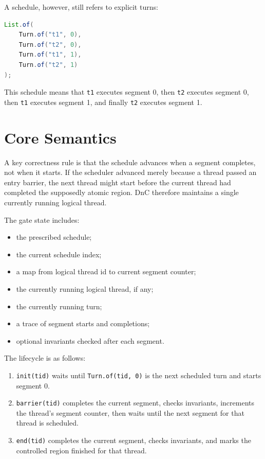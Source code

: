 \documentclass[11pt]{article}
\begin{document}
A schedule, however, still refers to explicit turns:

\begin{lstlisting}[language=Java,caption={A prescribed schedule}]
List.of(
    Turn.of("t1", 0),
    Turn.of("t2", 0),
    Turn.of("t1", 1),
    Turn.of("t2", 1)
);
\end{lstlisting}

This schedule means that \texttt{t1} executes segment 0, then \texttt{t2} executes segment 0, then \texttt{t1} executes segment 1, and finally \texttt{t2} executes segment 1.

\section{Core Semantics}

A key correctness rule is that the schedule advances when a segment completes, not when it starts. If the scheduler advanced merely because a thread passed an entry barrier, the next thread might start before the current thread had completed the supposedly atomic region. DnC therefore maintains a single currently running logical thread.

The gate state includes:

\begin{itemize}[nosep]
  \item the prescribed schedule;
  \item the current schedule index;
  \item a map from logical thread id to current segment counter;
  \item the currently running logical thread, if any;
  \item the currently running turn;
  \item a trace of segment starts and completions;
  \item optional invariants checked after each segment.
\end{itemize}

The lifecycle is as follows:

\begin{enumerate}[nosep]
  \item \texttt{init(tid)} waits until \texttt{Turn.of(tid, 0)} is the next scheduled turn and starts segment 0.
  \item \texttt{barrier(tid)} completes the current segment, checks invariants, increments the thread's segment counter, then waits until the next segment for that thread is scheduled.
  \item \texttt{end(tid)} completes the current segment, checks invariants, and marks the controlled region finished for that thread.
\end{enumerate}
\end{document}
